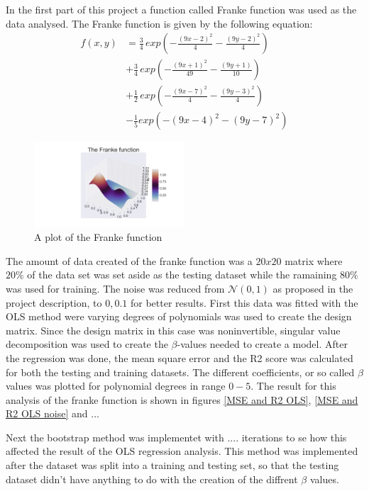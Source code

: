 \thispagestyle{plain}

\noindent In the first part of this project a function called Franke function
 was used as the data analysed. The Franke function is given by the following 
 equation:
\begin{align*}
    f(x,y) &= \frac{3}{4} \, exp\left(- \frac{(9x-2)^2}{4} - \frac{(9y-2)^2}{4}\right) \\
    &+ \frac{3}{4}\, exp\left( - \frac{(9x +1)^2}{49} - \frac{(9y+1)}{10}\right) \\
    &+ \frac{1}{2}\, exp\left( -\frac{(9x-7)^2}{4} - \frac{(9y-3)^2}{4}\right) \\
    &- \frac{1}{5} exp \left( - (9x -4)^2 - (9y-7)^2\right)
\end{align*}
\begin{figure}[H]
	\centering
	\includegraphics[width=0.5\textwidth]{Figure_1.png}
	\caption{\centering A plot of the Franke function }
	\label{Franke function}
\end{figure}
\noindent
The amount of data created of the franke function was a $20 x 20$ matrix where $20\%$
of the data set was set aside as the testing dataset while the ramaining $80\%$ was used for training. The noise 
was reduced from $\mathcal{N}(0,1)$ as proposed in the project description, to $\mathcal{0,0.1}$ for better results.
First this data was fitted with the OLS method were varying degrees of polynomials was used to create the design matrix.
Since the design matrix in this case was noninvertible, singular value decomposition was used to create 
the $\beta$-values needed to create a model. After the regression was done, the mean square error and the
R2 score was calculated for both the testing and training datasets. The different coefficients, or so called $\beta$
values was plotted for polynomial degrees in range $0-5$. The result for this analysis of the franke function
is shown in figures \eqref{MSE and R2 OLS}, \eqref{MSE and R2 OLS noise} and ... 


\noindent Next the bootstrap method was implementet with .... iterations to se how this 
affected the result of the OLS regression analysis. This method was implemented after the dataset
was split into a training and testing set, so that the testing dataset didn't have
anything to do with the creation of the diffrent $\beta$ values. 

